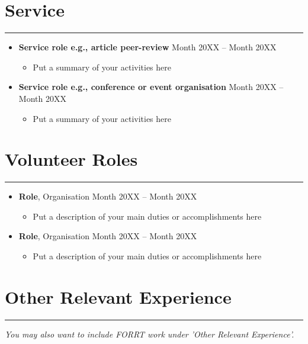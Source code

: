 \documentclass{article}
\begin{document}
\section*{Service}
\hrule
\vspace{1em}

\begin{itemize}[leftmargin=*]
    \item[] \textbf{Service role e.g., article peer-review} \hfill Month 20XX -- Month 20XX
    \begin{itemize}
        \item Put a summary of your activities here
    \end{itemize}

    \item[] \textbf{Service role e.g., conference or event organisation} \hfill Month 20XX -- Month 20XX
    \begin{itemize}
        \item Put a summary of your activities here
    \end{itemize}

\end{itemize}

\section*{Volunteer Roles}
\hrule
\vspace{1em}

\begin{itemize}[leftmargin=*]
    \item[] \textbf{Role}, Organisation \hfill Month 20XX -- Month 20XX
    \begin{itemize}
        \item Put a description of your main duties or accomplishments here
    \end{itemize}
    
    \item[] \textbf{Role}, Organisation \hfill Month 20XX -- Month 20XX
    \begin{itemize}
        \item Put a description of your main duties or accomplishments here
    \end{itemize}

\end{itemize}

\section*{Other Relevant Experience}
\hrule
\vspace{1em}
\textit{You may also want to include FORRT work under 'Other Relevant Experience'.}
\end{document}
